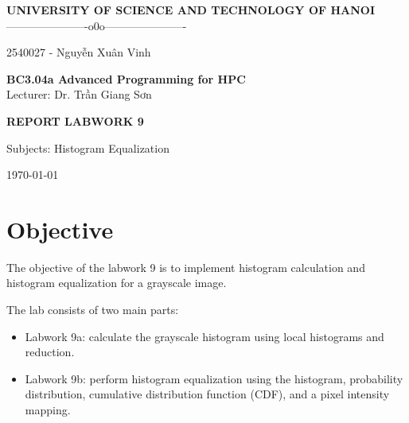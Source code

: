 \documentclass[11pt]{article}
\begin{document}
\begin{center}

{\Large \textbf{UNIVERSITY OF SCIENCE AND TECHNOLOGY OF HANOI}}\\
\vspace{0.3cm}
----------------------o0o----------------------\\

\vspace{4cm}

{\large
\centerline{2540027 - Nguyễn Xuân Vinh}
}

\vspace{4cm}

{\Huge \textbf{BC3.04a Advanced Programming for HPC}}\\
\vspace{0.5cm}
Lecturer: Dr. Trần Giang Sơn

\vspace{4cm}

{\Large \textbf{REPORT LABWORK 9}}\\

\vspace{0.5cm}

{\large
Subjects: Histogram Equalization
}

\vspace{4cm}
\today
\end{center}

\newpage

\newpage

\tableofcontents

\newpage

\section{Objective}

The objective of the labwork 9 is to implement histogram calculation and
histogram equalization for a grayscale image.

The lab consists of two main parts:

\begin{itemize}
    \item Labwork 9a: calculate the grayscale histogram using local
    histograms and reduction.
    \item Labwork 9b: perform histogram equalization using the histogram,
    probability distribution, cumulative distribution function (CDF), and
    a pixel intensity mapping.
\end{itemize}
\end{document}
